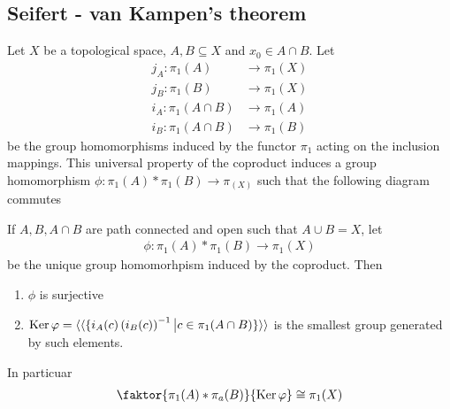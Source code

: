 \subsection{Seifert - van Kampen's theorem}

Let $X$ be a topological space, $A,B \subseteq X$ and $x_0 \in A \cap B$.
Let
\begin{align*}
  j_A: \pi_1(A) &\to \pi_1(X)\\
  j_B: \pi_1(B) &\to \pi_1(X)\\
  i_A: \pi_1(A\cap B) &\to \pi_1(A)\\
  i_B: \pi_1(A\cap B) &\to \pi_1(B)
\end{align*}
be the group homomorphisms induced by the functor $\pi_1$ acting on the inclusion mappings.
This universal property of the coproduct induces a group homomorphism
$\phi: \pi_1(A) \ast \pi_1(B) \to \pi_(X)$ such that the following diagram commutes
\begin{center}
\end{center}
\begin{thm}

If $A,B,A \cap B$ are path connected and open such that $A \cup B = X$, let
\begin{align*}
  \phi: \pi_1(A) \ast \pi_1(B) \to \pi_1(X)
\end{align*}
be the unique group homomorhpism induced by the coproduct. Then
\begin{enumerate}
  \item $\phi$ is surjective
  \item $\operatorname{Ker} \varphi = \langle\langle\{i_A(c)\left(
            i_B(c)
    \right)^{-1} \big\vert
    c \in \pi_1(A \cap B) 
    \}\rangle\rangle$ is the smallest group generated by such elements.
\end{enumerate}
In particuar
\begin{align*}
  \faktor{\pi_1(A) \ast \pi_a(B)}{\Ker \phi} \iso \pi_1(X)
\end{align*}
\end{thm}
